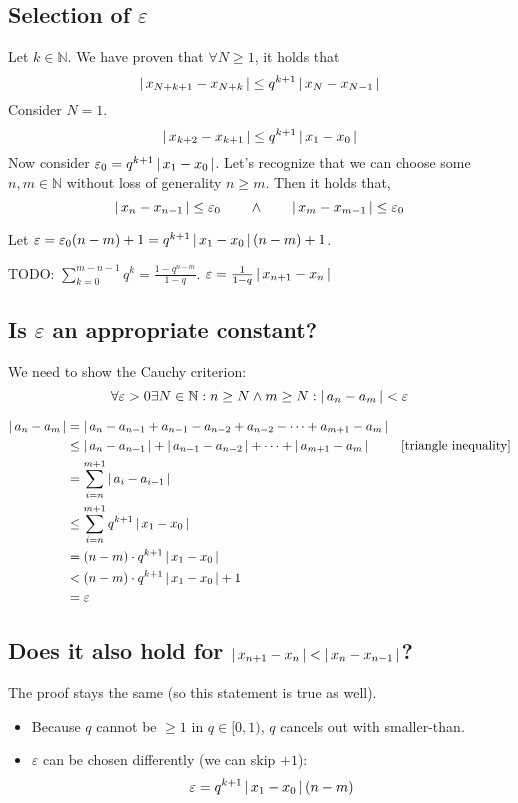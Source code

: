 \documentclass[a4paper]{article}
\theoremstyle{definition}
\newcommand\abs[1]{\left|\thinspace #1\thinspace\right|}
\begin{document}
\subsection{Selection of $\varepsilon$}
%
Let $k \in \mathbb N$. We have proven that $\forall N \geq 1$, it holds that
\[ \abs{x_{N+k+1} - x_{N+k}} \leq q^{k+1} \abs{x_N - x_{N-1}} \]
Consider $N = 1$.
\[ \abs{x_{k+2} - x_{k+1}} \leq q^{k+1} \abs{x_1 - x_0} \]
Now consider $\varepsilon_0 = q^{k+1} \abs{x_1 - x_0}$.
Let's recognize that we can choose some $n,m \in \mathbb N$ without loss of generality $n \geq m$.
Then it holds that,
\[ \abs{x_n - x_{n-1}} \leq \varepsilon_0 \qquad \land \qquad \abs{x_m - x_{m-1}} \leq \varepsilon_0 \]

Let $\varepsilon = \varepsilon_0 (n - m) + 1 = q^{k+1} \abs{x_1 - x_0}(n - m) + 1$.

TODO: $\sum_{k=0}^{m-n-1} q^k = \frac{1 - q^{n-m}}{1 - q}$.
$\varepsilon = \frac{1}{1 - q} \abs{x_{n+1} - x_n}$

\subsection{Is $\varepsilon$ an appropriate constant?}
%
We need to show the Cauchy criterion:
\[ \forall \varepsilon > 0 \exists N \in \mathbb N: n \geq N \land m \geq N: \abs{a_n - a_m} < \varepsilon \]

\begin{align*}
  \abs{a_n - a_m}
    &= \abs{a_n - a_{n-1} + a_{n-1} - a_{n-2} + a_{n-2} - \dots + a_{m+1} - a_m} \\
    &\leq \abs{a_n - a_{n-1}} + \abs{a_{n-1} - a_{n-2}} + \dots + \abs{a_{m+1} - a_m} & \text{[triangle inequality]} \\
    &= \sum_{i=n}^{m+1} \abs{a_i - a_{i-1}} \\
    &\leq \sum_{i=n}^{m+1} q^{k+1} \abs{x_1 - x_0} \\
    &= (n - m) \cdot q^{k+1} \abs{x_1 - x_0} \\
    &< (n - m) \cdot q^{k+1} \abs{x_1 - x_0} + 1 \\
    &= \varepsilon
\end{align*}

\subsection{Does it also hold for $\abs{x_{n+1} - x_n} < \abs{x_n - x_{n-1}}$?}
%
The proof stays the same (so this statement is true as well).
\begin{itemize}
  \item Because $q$ cannot be $\geq 1$ in $q \in [0,1)$, $q$ cancels out with smaller-than.
  \item $\varepsilon$ can be chosen differently (we can skip $+1$):
    \[ \varepsilon = q^{k+1} \abs{x_1 - x_0}(n - m) \]
\end{itemize}
\end{document}
